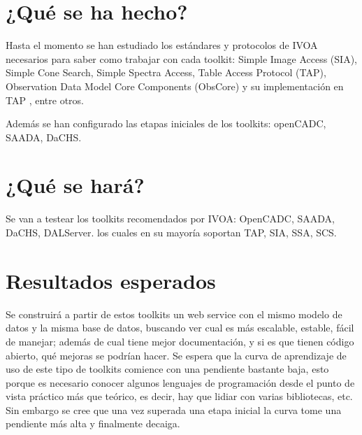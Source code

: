 \section{¿Qué se ha hecho?}

Hasta el momento se han estudiado los estándares y protocolos de IVOA
necesarios para saber como trabajar con cada toolkit: Simple Image Access (SIA),
Simple Cone Search, Simple Spectra Access, Table Access Protocol (TAP), Observation
Data Model Core Components (ObsCore) y su implementación en TAP \cite{obscore}, entre otros.

Además se han configurado las etapas iniciales de los toolkits: openCADC,
SAADA, DaCHS.

\section{¿Qué se hará?}

Se van a testear los toolkits recomendados por IVOA: OpenCADC, SAADA, DaCHS,
DALServer. los cuales en su mayoría soportan TAP, SIA, SSA, SCS.

\section{Resultados esperados}

Se construirá a partir de estos toolkits un web service con el mismo modelo de
datos y la misma base de datos, buscando ver cual es más escalable, estable, fácil
de manejar; además de cual tiene mejor documentación, y si es que tienen código
abierto, qué mejoras se podrían hacer. Se espera que la curva de aprendizaje de
uso de este tipo de toolkits comience con una pendiente bastante baja, esto
porque es necesario conocer algunos lenguajes de programación desde el punto de
vista práctico más que teórico, es decir, hay que lidiar con varias
bibliotecas, etc. Sin embargo se cree que una vez superada una etapa inicial la
curva tome una pendiente más alta y finalmente decaiga.

